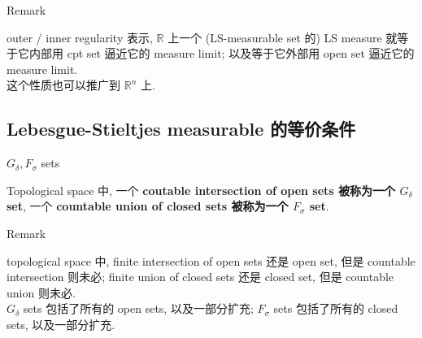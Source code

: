 \documentclass{qlnotes-export}
\begin{document}
\begin{qlremark}{Remark}

outer / inner regularity 表示, \(\mathbb{R}\) 上一个 (LS-measurable set 的) LS measure 就等于它内部用 cpt set 逼近它的 measure limit; 以及等于它外部用 open set 逼近它的 measure limit.\\
这个性质也可以推广到 \({\mathbb{R}}^{n}\) 上.

\end{qlremark}

\subsection{Lebesgue-Stieltjes measurable 的等价条件}\label{lebesgue-stieltjes-measurable-ux7684ux7b49ux4ef7ux6761ux4ef6}

\begin{definition}{\(G_{\delta},F_{\sigma}\) sets}\label{def-03-distribution-function-lebesgue-stieltjes-measures-g-delta-f-sigma-sets}

Topological space 中, 一个 \textbf{coutable intersection of open sets 被称为一个 \(G_{\delta}\) set}, 一个 \textbf{countable union of closed sets 被称为一个 \(F_{\sigma}\) set}.

\end{definition}

\begin{qlremark}{Remark}

topological space 中, finite intersection of open sets 还是 open set, 但是 countable intersection 则未必; finite union of closed sets 还是 closed set, 但是 countable union 则未必.\\
\(G_{\delta}\) sets 包括了所有的 open sets, 以及一部分扩充; \(F_{\sigma}\) sets 包括了所有的 closed sets, 以及一部分扩充.

\end{qlremark}
\end{document}
